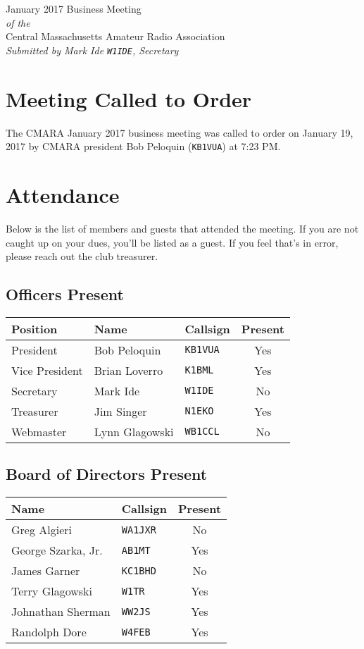 \documentclass[10pt,letterpaper]{article}
\begin{document}
\begin{center}
{\huge January 2017 Business Meeting}\\
\emph{of the}\\
{\Large Central Massachusetts Amateur Radio Association}\\
\emph{Submitted by Mark Ide \texttt{W1IDE}, Secretary}
\end{center}

\section{Meeting Called to Order}
The CMARA January 2017 business meeting was called to order on January 19, 2017 by CMARA president Bob Peloquin (\texttt{KB1VUA}) at 7:23 PM.

\section{Attendance}
\noindent
Below is the list of members and guests that attended the meeting. If you are not caught up on your dues, you'll be listed as a guest. If you feel that's in error, please reach out the club treasurer.

\subsection{Officers Present}
\begin{tabular}{|l|l|l|c|}
  \hline
  \textbf{Position} & \textbf{Name}  & \textbf{Callsign} & \textbf{Present} \\ \hline
  President         & Bob Peloquin   & \texttt{KB1VUA}   & Yes \\
  Vice President    & Brian Loverro  & \texttt{K1BML}    & Yes \\
  Secretary         & Mark Ide       & \texttt{W1IDE}    & No  \\
  Treasurer         & Jim Singer     & \texttt{N1EKO}    & Yes \\
  Webmaster         & Lynn Glagowski & \texttt{WB1CCL}   & No  \\
  \hline
\end{tabular}

\subsection{Board of Directors Present}
\begin{tabular}{|l|l|c|}
  \hline
  \textbf{Name}      & \textbf{Callsign} & \textbf{Present} \\ \hline
  Greg Algieri       & \texttt{WA1JXR}   & No  \\
  George Szarka, Jr. & \texttt{AB1MT}    & Yes \\
  James Garner       & \texttt{KC1BHD}   & No  \\
  Terry Glagowski    & \texttt{W1TR}     & Yes \\
  Johnathan Sherman  & \texttt{WW2JS}    & Yes \\
  Randolph Dore      & \texttt{W4FEB}    & Yes \\
  \hline
\end{tabular}
\end{document}

